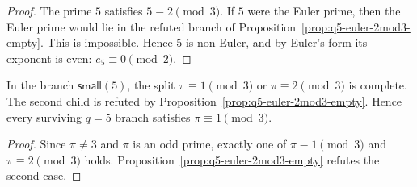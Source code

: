 \begin{proof}
The prime \(5\) satisfies \(5\equiv2\pmod3\).
If $5$ were the Euler prime, then the Euler prime would lie in the refuted branch
of Proposition~\ref{prop:q5-euler-2mod3-empty}.  This is impossible.  Hence $5$
is non-Euler, and by Euler's form its exponent is even:
\(e_5\equiv0\pmod2\).
\end{proof}

\begin{corollary}[First coverage split in the $q=5$ branch]
\label{cor:q5-first-coverage-split}
In the branch \(\mathsf{small}(5)\), the split \(\pi\equiv1\pmod3\) or
\(\pi\equiv2\pmod3\) is complete.  The second child is refuted by
Proposition~\ref{prop:q5-euler-2mod3-empty}.  Hence every surviving
\(q=5\) branch satisfies \(\pi\equiv1\pmod3\).
\end{corollary}

\begin{proof}
Since \(\pi\ne3\) and \(\pi\) is an odd prime, exactly one of
\(\pi\equiv1\pmod3\) and \(\pi\equiv2\pmod3\) holds.
Proposition~\ref{prop:q5-euler-2mod3-empty} refutes the second case.
\end{proof}

